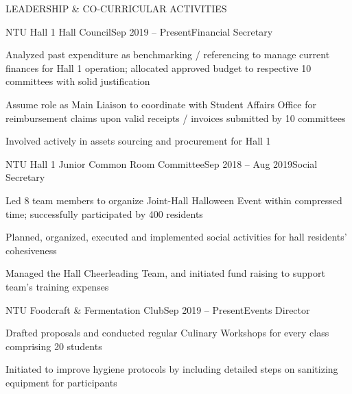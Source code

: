 \documentclass{resume} %
\begin{document}
\begin{rSection}{LEADERSHIP \& CO-CURRICULAR ACTIVITIES}

\begin{rSubsection}{NTU Hall 1 Hall Council}{Sep 2019 – Present}{Financial Secretary}{}
\item Analyzed past expenditure as benchmarking / referencing to manage current finances for Hall 1 operation; allocated approved budget to respective 10 committees with solid justification
\item Assume role as Main Liaison to coordinate with Student Affairs Office for reimbursement claims upon valid receipts / invoices submitted by 10 committees 
\item Involved actively in assets sourcing and procurement for Hall 1

\end{rSubsection}

\begin{rSubsection}{NTU Hall 1 Junior Common Room Committee}{Sep 2018 – Aug 2019}{Social Secretary}{}
\item Led 8 team members to organize Joint-Hall Halloween Event within compressed time; successfully participated by 400 residents
\item Planned, organized, executed and implemented social activities for hall residents’ cohesiveness
\item Managed the Hall Cheerleading Team, and initiated fund raising to support team's training expenses

\end{rSubsection}

\begin{rSubsection}{NTU Foodcraft \& Fermentation Club}{Sep 2019 – Present}{Events Director}{}
\item Drafted proposals and conducted regular Culinary Workshops for every class comprising 20 students
\item Initiated to improve hygiene protocols by including detailed steps on sanitizing equipment for participants

\end{rSubsection}
    
\end{rSection}

\end{document}
